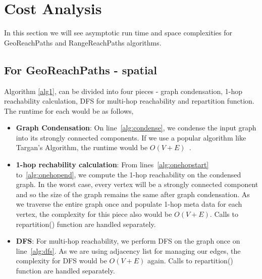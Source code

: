 \section{Cost Analysis}

In this section we will see asymptotic run time and space complexities for GeoReachPaths and RangeReachPaths algorithms.

\subsection{For GeoReachPaths - spatial}
Algorithm \ref{alg1}, can be divided into four pieces - graph condensation, 1-hop reachability calculation, DFS for multi-hop reachability and repartition function. The runtime for each would be as follows,
\begin{itemize}

  \item \textbf{Graph Condensation}: On line~\ref{alg:condense}, we condense the input graph into its strongly connected components. If we use a popular algorithm like Targan's Algorithm, the runtime would be $O(V + E)$~\cite{R1972}.

  \item \textbf{1-hop rechability calculation}: From lines~\ref{alg:onehopstart} to~\ref{alg:onehopend}, we compute the 1-hop reachability on the condensed graph. In the worst case, every vertex will be a strongly connected component and so the size of the graph remains the same after graph condensation. As we traverse the entire graph once and populate 1-hop meta data for each vertex, the complexity for this piece also would be $O(V + E)$. Calls to repartition() function are handled separately.

  \item \textbf{DFS}: For multi-hop reachability, we perform DFS on the graph once on line~\ref{alg:dfs}. As we are using adjacency list for managing our edges, the complexity for DFS would be $O(V + E)$ again. Calls to repartition() function are handled separately.


\end{itemize}
